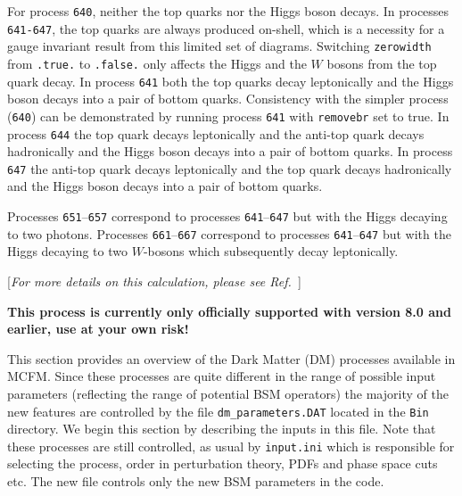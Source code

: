 For process {\tt 640}, neither the top quarks nor the Higgs boson
decays. 
In processes {\tt 641-647}, the top quarks are always
produced on-shell, which is a necessity for a gauge invariant result
from this limited set of diagrams.
Switching {\tt zerowidth} from {\tt .true.} to {\tt .false.} only affects
the Higgs and the $W$ bosons from the top quark decay.
In process {\tt 641} both the top quarks decay leptonically
and the Higgs boson decays into a pair of bottom quarks. 
Consistency with
the simpler process ({\tt 640}) can be demonstrated by running process
{\tt 641} with {\tt removebr} set to true.
In process {\tt 644} the top quark decays leptonically
and the anti-top quark decays hadronically and the Higgs boson decays into a pair of bottom quarks. 
In process {\tt 647} the anti-top quark decays leptonically
and the top quark decays hadronically and the Higgs boson decays into a pair of bottom quarks. 

Processes {\tt 651}--{\tt 657} correspond to processes {\tt 641}--{\tt 647} but with the Higgs decaying
to two photons.
Processes {\tt 661}--{\tt 667} correspond to processes {\tt 641}--{\tt 647} but with the Higgs decaying
to two $W$-bosons which subsequently decay leptonically.


\begin{center}
[{\it For more details on this calculation, please see Ref.~\cite{Fox:2012ru}}]
\end{center}

\textbf{This process is currently only officially supported with version 8.0 and earlier, use at your own risk!}

This section provides an overview of the Dark Matter (DM) processes
available in MCFM. Since these processes are quite different in the
range of possible input parameters (reflecting the range of potential
BSM operators) the majority of the new features are controlled by the
file {\tt dm\_parameters.DAT} located in the {\tt Bin} directory.  We
begin this section by describing the inputs in this file.  Note that
these processes are still controlled, as usual by {\tt input.ini}
which is responsible for selecting the process, order in perturbation
theory, PDFs and phase space cuts etc. The new file controls only the
new BSM parameters in the code.


